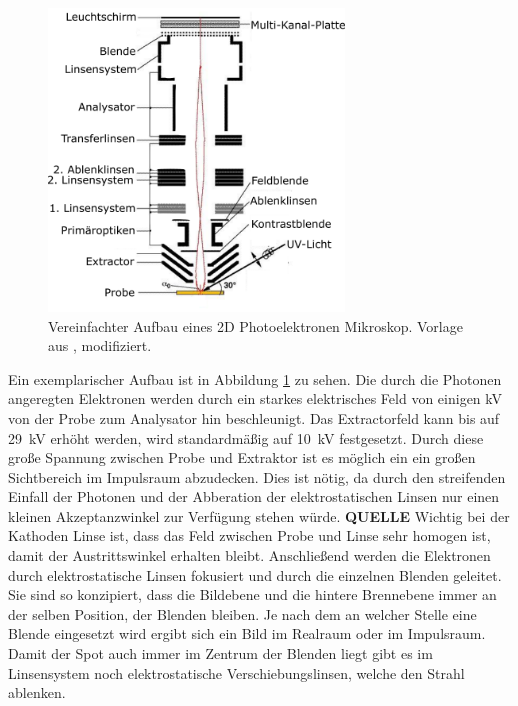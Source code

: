         \begin{figure}
            \centering
            \includegraphics[width=0.7\textwidth]{./content/PEEM_schemaneu.png}
            \caption{Vereinfachter Aufbau eines 2D Photoelektronen Mikroskop. Vorlage aus \cite{KUCH}, modifiziert.}
            \label{fig:MM}
        \end{figure}
        Ein exemplarischer Aufbau ist in Abbildung \ref{fig:MM} zu sehen.
        Die durch die Photonen angeregten Elektronen werden durch ein starkes elektrisches Feld von einigen \si{\kilo\volt} von der Probe zum Analysator hin beschleunigt.
        Das Extractorfeld kann bis auf \SI{29}{\kilo\volt} erhöht werden, wird standardmäßig auf \SI{10}{\kilo\volt} festgesetzt.
        Durch diese große Spannung zwischen Probe und Extraktor ist es möglich ein ein großen Sichtbereich im Impulsraum abzudecken.
        Dies ist nötig, da durch den streifenden Einfall der Photonen und der Abberation der elektrostatischen Linsen nur einen kleinen Akzeptanzwinkel zur Verfügung stehen würde. \textbf{QUELLE}
        Wichtig bei der Kathoden Linse ist, dass das Feld zwischen Probe und Linse sehr homogen ist, damit der Austrittswinkel erhalten bleibt.
        Anschließend werden die Elektronen durch elektrostatische Linsen fokusiert und durch die einzelnen Blenden geleitet.
        Sie sind so konzipiert, dass die Bildebene und die hintere Brennebene immer an der selben Position, der Blenden bleiben.
        Je nach dem an welcher Stelle eine Blende eingesetzt wird ergibt sich ein Bild im Realraum oder im Impulsraum.
        Damit der Spot auch immer im Zentrum der Blenden liegt gibt es im Linsensystem noch elektrostatische Verschiebungslinsen, welche den Strahl ablenken.
